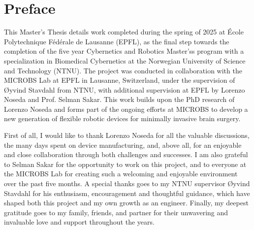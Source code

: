 
\section*{Preface}




This Master's Thesis details work completed during the spring of 2025 at École Polytechnique Fédérale de Lausanne (EPFL), as the final step towards the completion of the five year Cybernetics and Robotics Master'ss program with a specialization in Biomedical Cybernetics at the Norwegian University of Science and Technology (NTNU). The project was conducted in collaboration with the MICROBS Lab at EPFL in Lausanne, Switzerland, under the supervision of Øyvind Stavdahl from NTNU, with additional supervision at EPFL by Lorenzo Noseda and Prof. Selman Sakar. This work builds upon the PhD research of Lorenzo Noseda and forms part of the ongoing efforts at MICROBS to develop a new generation of flexible robotic devices for minimally invasive brain surgery.

First of all, I would like to thank Lorenzo Noseda for all the valuable discussions, the many days spent on device manufacturing, and, above all, for an enjoyable and close collaboration through both challenges and successes. I am also grateful to Selman Sakar for the opportunity to work on this project, and to everyone at the MICROBS Lab for creating such a welcoming and enjoyable environment over the past five months. A special thanks goes to my NTNU supervisor Øyvind Stavdahl for his enthusiasm, encouragement and thoughtful guidance, which have shaped both this project and my own growth as an engineer. Finally, my deepest gratitude goes to my family, friends, and partner for their unwavering and invaluable love and support throughout the years.




